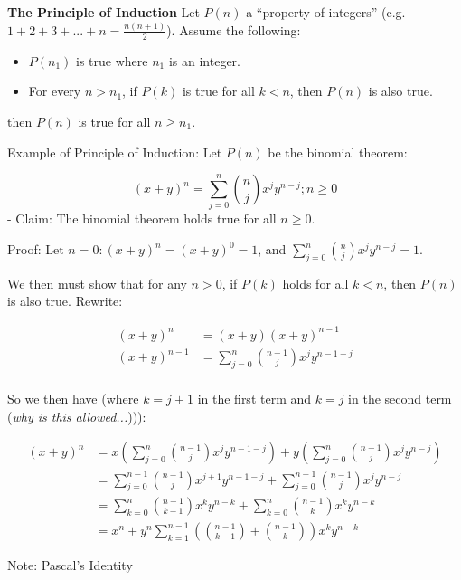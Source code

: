 \documentclass{report}
\begin{document}
\textbf{The Principle of Induction} Let $P(n)$ a "`property of integers"' (e.g. $1 + 2 + 3 + ... + n = \frac{n(n+1)}{2}$). Assume the following:

\begin{itemize}
\item $P(n_1)$ is true where $n_1$ is an integer.
\item For every $n > n_1$, if $P(k)$ is true for all $k<n$, then $P(n)$ is also true.
\end{itemize}

then $P(n)$ is true for all $n \geq n_1$.

Example of Principle of Induction: Let $P(n)$ be the binomial theorem:

$$(x+y)^n = \displaystyle\sum\limits_{j=0}^n {\binom{n}{j} x^j y^{n-j}}; n \geq 0$$
-
Claim: The binomial theorem holds true for all $n \geq 0$. 

Proof: Let $n = 0: (x + y)^n = (x + y) ^0  = 1$, and $\displaystyle\sum\limits_{j=0}^{n} {n \choose j} x^j y^{n-j} = 1$. 

We then must show that for any $n > 0$, if $P(k)$ holds for all $k < n$, then $P(n)$ is also true. Rewrite:

\begin{align*}
(x+y)^n &= (x+y)(x+y)^{n-1}\\
(x+y)^{n-1} &= \displaystyle\sum\limits_{j=0}^n {n-1 \choose j} x^j y^{n-1-j}\\
\end{align*}

So we then have (where $k = j+1$ in the first term and $k = j$ in the second term (\emph{why is this allowed...}))):

\begin{align*}
(x+y)^n &= x(\displaystyle\sum\limits_{j=0}^n {n-1 \choose j} x^j y^{n-1-j}) + y(\displaystyle\sum\limits_{j=0}^n {n-1 \choose j} x^j y^{n-j})\\
&= \displaystyle\sum\limits_{j=0}^{n-1} {n-1 \choose j} x^{j+1} y^{n-1-j} + \displaystyle\sum\limits_{j=0}^{n-1} {n-1 \choose j} x^j y^{n-j}\\
&= \displaystyle\sum\limits_{k=0}^n {n-1 \choose k-1} x^{k} y^{n-k} + \displaystyle\sum\limits_{k=0}^n {n-1 \choose k} x^k y^{n-k}\\
&= x^n + y^n  \displaystyle\sum\limits_{k=1}^{n-1} ({n-1 \choose k-1} + {n-1 \choose k}) x^k y^{n-k}
\end{align*}

Note: Pascal's Identity
\end{document}

